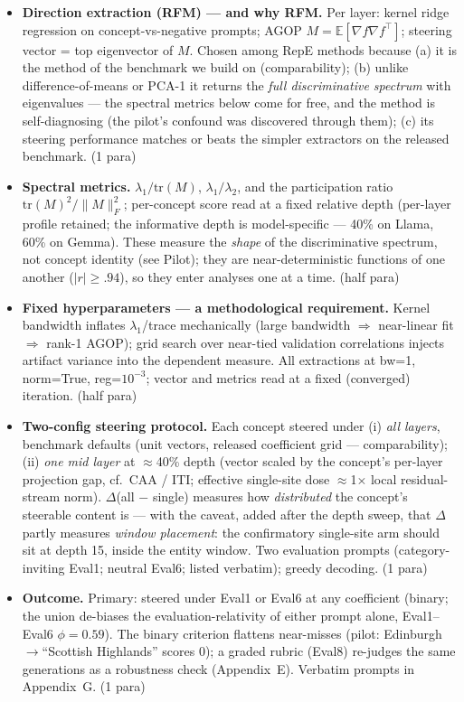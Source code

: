 \documentclass[11pt]{article}
\newenvironment{outline}{\color{gray!70!black}\begin{itemize}[leftmargin=1.2em,itemsep=1pt]}{\end{itemize}\color{black}}
\begin{document}
\begin{outline}
\item \textbf{Direction extraction (RFM) --- and why RFM.} Per layer: kernel ridge regression on concept-vs-negative prompts; AGOP $M = \mathbb{E}[\nabla f \nabla f^{\top}]$; steering vector = top eigenvector of $M$. Chosen among RepE methods because (a) it is the method of the benchmark we build on (comparability); (b) unlike difference-of-means or PCA-1 it returns the \emph{full discriminative spectrum} with eigenvalues --- the spectral metrics below come for free, and the method is self-diagnosing (the pilot's confound was discovered through them); (c) its steering performance matches or beats the simpler extractors on the released benchmark. (1 para)
\item \textbf{Spectral metrics.} $\lambda_1/\mathrm{tr}(M)$, $\lambda_1/\lambda_2$, and the participation ratio $\mathrm{tr}(M)^2/\|M\|_F^2$; per-concept score read at a fixed relative depth (per-layer profile retained; the informative depth is model-specific --- 40\% on Llama, 60\% on Gemma). These measure the \emph{shape} of the discriminative spectrum, not concept identity (see Pilot); they are near-deterministic functions of one another ($|r| \geq .94$), so they enter analyses one at a time. (half para)
\item \textbf{Fixed hyperparameters --- a methodological requirement.} Kernel bandwidth inflates $\lambda_1$/trace mechanically (large bandwidth $\Rightarrow$ near-linear fit $\Rightarrow$ rank-1 AGOP); grid search over near-tied validation correlations injects artifact variance into the dependent measure. All extractions at bw=1, norm=True, reg=$10^{-3}$; vector and metrics read at a fixed (converged) iteration. (half para)
\item \textbf{Two-config steering protocol.} Each concept steered under (i) \emph{all layers}, benchmark defaults (unit vectors, released coefficient grid --- comparability); (ii) \emph{one mid layer} at $\approx$40\% depth (vector scaled by the concept's per-layer projection gap, cf.\ CAA / ITI; effective single-site dose $\approx$1$\times$ local residual-stream norm). $\Delta$(all $-$ single) measures how \emph{distributed} the concept's steerable content is --- with the caveat, added after the depth sweep, that $\Delta$ partly measures \emph{window placement}: the confirmatory single-site arm should sit at depth 15, inside the entity window. Two evaluation prompts (category-inviting Eval1; neutral Eval6; listed verbatim); greedy decoding. (1 para)
\item \textbf{Outcome.} Primary: steered under Eval1 or Eval6 at any coefficient (binary; the union de-biases the evaluation-relativity of either prompt alone, Eval1--Eval6 $\phi{=}0.59$). The binary criterion flattens near-misses (pilot: Edinburgh$\to$``Scottish Highlands'' scores 0); a graded rubric (Eval8) re-judges the same generations as a robustness check (Appendix~E). Verbatim prompts in Appendix~G. (1 para)

\end{outline}
\end{document}
